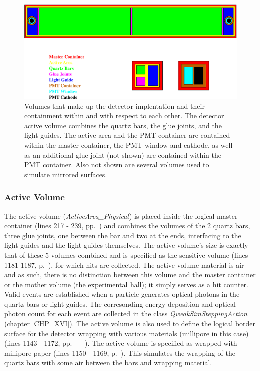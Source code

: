 \begin{figure}[h]
  \hspace{1.0cm}
  \includegraphics[scale=0.6]{./figures5/VolumeCont.eps}
  \caption{Volumes that make up the detector implentation and their
           containment within and with respect to each other. The
           detector active volume combines the quartz bars, the glue
           joints, and the light guides. The active area and the PMT
           container are contained within the master container, the
           PMT window and cathode, as well as an additional glue joint
           (not shown) are contained within the PMT container. Also
           not shown are several volumes used to simulate mirrored 
           surfaces.}
           \label{fig:VOLCONT}
\end{figure}

\subsubsection{Active Volume}

The active volume ({\it ActiveArea\_Physical}) is placed inside the
logical master container (lines 217 - 239, pp.~\pageref{SourceV4}) and
combines the volumes of the 2 quartz bars, three glue joints, one
between the bar and two at the ends, interfacing to the light guides
and the light guides themselves. The active volume's size is exactly
that of these 5 volumes combined and is specified as the sensitive
volume (lines 1181-1187, p.~\pageref{SourceV19}), for which hits are 
collected. The active volume material is air and as such, there is 
no distinction between this volume and the master container or the
mother volume (the experimental hall); it simply serves as a hit 
counter. Valid events are established when a particle generates
optical photons in the quartz bars or light guides. The corresonding
energy deposition and optical photon count for each event are collected
in the class {\it QweakSimSteppingAction} (chapter \ref{CHP_XVI}).
The active volume is also used to define the logical border surface for
the detector wrapping with various materials (millipore in this case)
(lines 1143 - 1172, pp.~\pageref{SourceV18}~-~\pageref{SourceV19}).
The active volume is specified as wrapped with millipore paper (lines
1150 - 1169, p.~\pageref{SourceV17}). This simulates the wrapping of
the quartz bars with some air between the bars and wrapping material.

